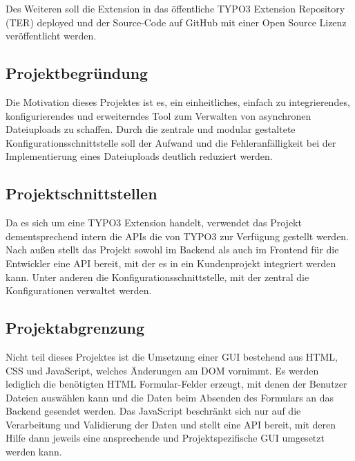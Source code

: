 Des Weiteren soll die Extension in das öffentliche TYPO3 Extension Repository (TER) deployed und der Source-Code auf GitHub mit einer Open Source Lizenz veröffentlicht werden. 


\subsection{Projektbegründung} 
\label{sec:Projektbegruendung}
Die Motivation dieses Projektes ist es, ein einheitliches, einfach zu integrierendes, konfigurierendes und erweiterndes Tool zum Verwalten von asynchronen Dateiuploads zu schaffen. Durch die zentrale und modular gestaltete Konfigurationsschnittstelle soll der Aufwand und die Fehleranfälligkeit bei der Implementierung eines Dateiuploads deutlich reduziert werden.


\subsection{Projektschnittstellen} 
\label{sec:Projektschnittstellen}
Da es sich um eine TYPO3 Extension handelt, verwendet das Projekt dementsprechend intern die APIs die von TYPO3 zur Verfügung gestellt werden. Nach außen stellt das Projekt sowohl im Backend als auch im Frontend für die Entwickler eine API bereit, mit der es in ein Kundenprojekt integriert werden kann. Unter anderen die Konfigurationsschnittstelle, mit der zentral die Konfigurationen verwaltet werden.


\subsection{Projektabgrenzung} 
\label{sec:Projektabgrenzung}
Nicht teil dieses Projektes ist die Umsetzung einer GUI bestehend aus HTML, CSS und JavaScript, welches Änderungen am DOM vornimmt. Es werden lediglich die benötigten HTML Formular-Felder erzeugt, mit denen der Benutzer Dateien auswählen kann und die Daten beim Absenden des Formulars an das Backend gesendet werden. Das JavaScript beschränkt sich nur auf die Verarbeitung und Validierung der Daten und stellt eine API bereit, mit deren Hilfe dann jeweils eine ansprechende und Projektspezifische GUI umgesetzt werden kann.

